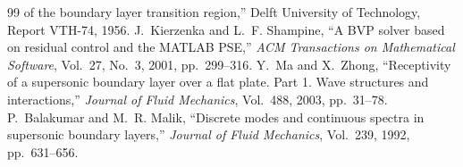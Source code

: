 \documentclass[11pt]{article}
\begin{document}
\begin{thebibliography}{99}
  of the boundary layer transition region,'' Delft University of Technology, Report VTH-74,
  1956.
 J.~Kierzenka and L.~F. Shampine, ``A BVP solver based on residual
  control and the MATLAB PSE,'' \emph{ACM Transactions on Mathematical Software}, Vol.~27,
  No.~3, 2001, pp.~299--316.
 Y.~Ma and X.~Zhong, ``Receptivity of a supersonic boundary layer over a
  flat plate. Part 1. Wave structures and interactions,'' \emph{Journal of Fluid Mechanics},
  Vol.~488, 2003, pp.~31--78.
 P.~Balakumar and M.~R. Malik, ``Discrete modes and continuous spectra in
  supersonic boundary layers,'' \emph{Journal of Fluid Mechanics}, Vol.~239, 1992, pp.~631--656.
\end{thebibliography}
\end{document}

